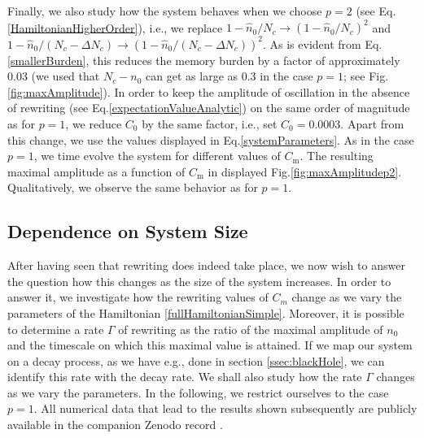 \documentclass[aps,prd,reprint,superscriptaddress,nofootinbib]{revtex4-2}
\makeatletter
\newcommand*{\ie}{i.e., }
\newcommand*{\fig}{Fig.\@\xspace}
\newcommand*{\Eq}{Eq.\@\xspace}
\makeatother
\begin{document}
Finally, we also study how the system behaves when we choose $p=2$ (see 
\Eq \eqref{HamiltonianHigherOrder}), \ie we replace $1-\hat{n}_0/N_c \rightarrow (1-\hat{n}_0/N_c)^2$ and $1-\hat{n}_0/(N_c-\Delta N_c)\rightarrow 
(1-\hat{n}_0/(N_c-\Delta N_c))^2$. As is evident from \Eq \eqref{smallerBurden}, this reduces the memory burden by a factor of approximately $0.03$ (we used that $N_c-n_0$ can get as large as $0.3$ in the case $p=1$; see \fig \ref{fig:maxAmplitude}). In order to keep the amplitude of oscillation in the absence of rewriting (see \Eq \eqref{expectationValueAnalytic}) on the same order of magnitude as for $p=1$, we reduce $C_0$ by the same factor, \ie set $C_0 =0.0003$. Apart from this change, we use the values displayed in \Eq \eqref{systemParameters}. As in the case $p=1$, we time evolve the system for different values of $C_{\text{m}}$. The resulting maximal amplitude as a function of $C_{\text{m}}$ in displayed \fig \ref{fig:maxAmplitudep2}. Qualitatively, we observe the same behavior as for $p=1$.



\subsection{Dependence on System Size}
After having seen that rewriting does indeed take place, we now wish to answer the question how this changes as the size of the system increases. In order to answer it, we investigate how the rewriting values of $C_m$ change as we vary the parameters of the Hamiltonian \eqref{fullHamiltonianSimple}. 
Moreover, it is possible to determine a rate $\Gamma$ of rewriting as the 
ratio of the maximal amplitude of $n_0$ and the timescale on which this maximal value is attained. If we map our system on a decay process, as we have e.g., done in section \ref{ssec:blackHole}, we can identify this rate with the decay rate. We shall also study how the rate $\Gamma$ changes as we vary the parameters. In the following, we restrict ourselves to the 
case $p=1$. All numerical data that lead to the results shown subsequently are publicly available in the companion Zenodo record \cite{data}.
\end{document}
